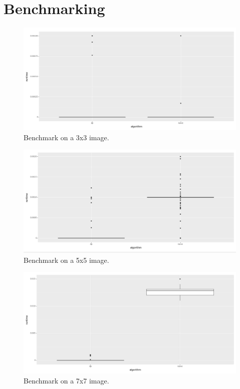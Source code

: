\documentclass[12pt,letterpaper]{article}
\begin{document}
\section*{Benchmarking}

\begin{figure}[!h]
  \centering
  \includegraphics[width=1.0\linewidth]{benchmark_3x3.jpg}
  \caption{Benchmark on a 3x3 image.}
  \end{figure}

\begin{figure}[!h]
  \centering
  \includegraphics[width=1.0\linewidth]{benchmark_5x5.jpg}
  \caption{Benchmark on a 5x5 image.}
  \end{figure}

\newpage

\begin{figure}[!h]
  \centering
  \includegraphics[width=1.0\linewidth]{benchmark_7x7.jpg}
  \caption{Benchmark on a 7x7 image.}
  \end{figure}
\end{document}
